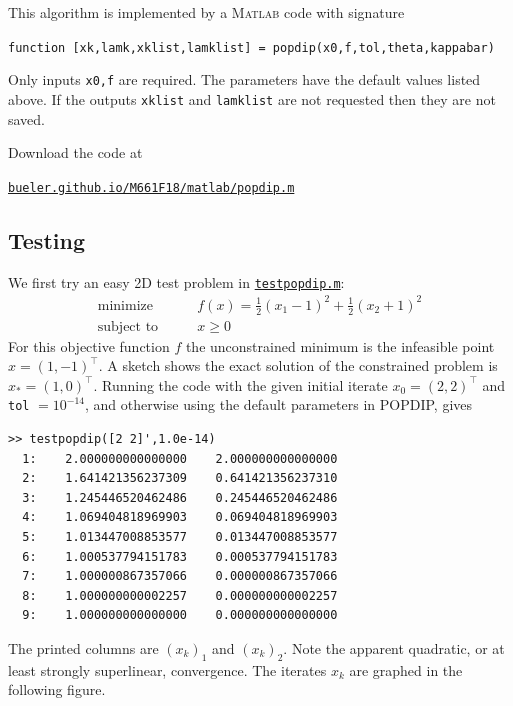 \documentclass[11pt]{article}
\newcommand{\Matlab}{\textsc{Matlab}\xspace}
\begin{document}
This algorithm is implemented by a \Matlab code with signature
\begin{center}
\texttt{function [xk,lamk,xklist,lamklist] = popdip(x0,f,tol,theta,kappabar)}
\end{center}
Only inputs \texttt{x0,f} are required.  The parameters have the default values listed above.  If the outputs \texttt{xklist} and \texttt{lamklist} are not requested then they are not saved.

Download the code at
\begin{center}
    \href{http://bueler.github.io/M661F18/matlab/popdip.m}{\texttt{bueler.github.io/M661F18/matlab/popdip.m}}
\end{center}


\subsection*{Testing}

We first try an easy 2D test problem in \href{http://bueler.github.io/M661F18/matlab/testpopdip.m}{\texttt{testpopdip.m}}:
\begin{equation}
\begin{matrix}
\text{minimize} \qquad & f(x) = \frac{1}{2} (x_1-1)^2 + \frac{1}{2} (x_2+1)^2 \\
\text{subject to} \qquad & x \ge 0
\end{matrix} \label{testoneproblem}
\end{equation}
For this objective function $f$ the unconstrained minimum is the infeasible point $\hat x =(1,-1)^\top$.  A sketch shows the exact solution of the constrained problem is $x_*=(1,0)^\top$.  Running the code with the given initial iterate $x_0=(2,2)^\top$ and \texttt{tol} $=10^{-14}$, and otherwise using the default parameters in POPDIP, gives
\begin{Verbatim}[fontsize=\small]
>> testpopdip([2 2]',1.0e-14)
  1:    2.000000000000000    2.000000000000000
  2:    1.641421356237309    0.641421356237310
  3:    1.245446520462486    0.245446520462486
  4:    1.069404818969903    0.069404818969903
  5:    1.013447008853577    0.013447008853577
  6:    1.000537794151783    0.000537794151783
  7:    1.000000867357066    0.000000867357066
  8:    1.000000000002257    0.000000000002257
  9:    1.000000000000000    0.000000000000000
\end{Verbatim}
The printed columns are $(x_k)_1$ and $(x_k)_2$.  Note the apparent quadratic, or at least strongly superlinear, convergence.  The iterates $x_k$ are graphed in the following figure.
\end{document}
